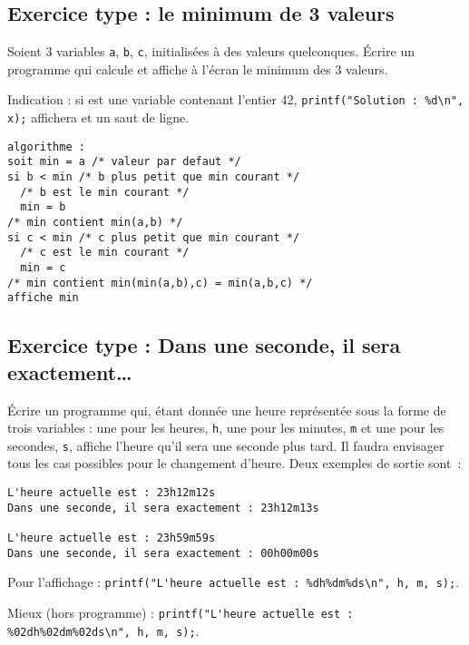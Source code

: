 \subsection{Exercice type :  le minimum de 3 valeurs}

Soient 3 variables \verb|a|, \verb|b|, \verb|c|, initialisées à des
valeurs quelconques. Écrire un programme qui calcule et affiche à
l'écran le minimum des 3 valeurs.

Indication : si  est une variable contenant l'entier 42,
\verb|printf("Solution : %d\n", x);| affichera  et
un saut de ligne.

\begin{correction}
\begin{verbatim}
algorithme :
soit min = a /* valeur par defaut */
si b < min /* b plus petit que min courant */
  /* b est le min courant */
  min = b
/* min contient min(a,b) */
si c < min /* c plus petit que min courant */
  /* c est le min courant */
  min = c
/* min contient min(min(a,b),c) = min(a,b,c) */
affiche min
\end{verbatim}
\begin{listing}{1}
\end{listing}
\end{correction}

\subsection{Exercice type : Dans une seconde, il sera exactement\ldots}

Écrire un programme qui, étant donnée une heure représentée
sous la forme de trois variables : une pour les heures, \verb|h|, une pour
les minutes,
\verb|m| et une pour les secondes, \verb|s|, affiche l'heure qu'il sera une
seconde plus tard. Il faudra envisager tous les
cas possibles pour le changement d'heure. Deux exemples de sortie sont~:

\begin{verbatim}
L'heure actuelle est : 23h12m12s
Dans une seconde, il sera exactement : 23h12m13s

L'heure actuelle est : 23h59m59s
Dans une seconde, il sera exactement : 00h00m00s
\end{verbatim}

Pour l'affichage :
\verb|printf("L'heure actuelle est : %dh%dm%ds\n", h, m, s);|.

\begin{correction}
Mieux (hors programme) :
  \verb|printf("L'heure actuelle est : %02dh%02dm%02ds\n", h, m, s);|.
\end{correction}

